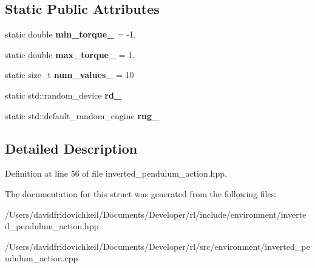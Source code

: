 \subsection*{Static Public Attributes}
\begin{DoxyCompactItemize}
\item 
\hypertarget{structrl_1_1_inverted_pendulum_action_a8528d08456532e7ed1f5a6db231b1f7c}{}\label{structrl_1_1_inverted_pendulum_action_a8528d08456532e7ed1f5a6db231b1f7c} 
static double {\bfseries min\+\_\+torque\+\_\+} = -\/1.
\item 
\hypertarget{structrl_1_1_inverted_pendulum_action_a6e16eacb6385fa7cbed55574aa289d25}{}\label{structrl_1_1_inverted_pendulum_action_a6e16eacb6385fa7cbed55574aa289d25} 
static double {\bfseries max\+\_\+torque\+\_\+} = 1.
\item 
\hypertarget{structrl_1_1_inverted_pendulum_action_a6ecf98651ffe081568448271dbfea5f0}{}\label{structrl_1_1_inverted_pendulum_action_a6ecf98651ffe081568448271dbfea5f0} 
static size\+\_\+t {\bfseries num\+\_\+values\+\_\+} = 10
\item 
\hypertarget{structrl_1_1_inverted_pendulum_action_a452e62a495021bd309ed00da4a73b212}{}\label{structrl_1_1_inverted_pendulum_action_a452e62a495021bd309ed00da4a73b212} 
static std\+::random\+\_\+device {\bfseries rd\+\_\+}
\item 
\hypertarget{structrl_1_1_inverted_pendulum_action_a14025e055bf7cdae2ca98b5cfbd4e0a0}{}\label{structrl_1_1_inverted_pendulum_action_a14025e055bf7cdae2ca98b5cfbd4e0a0} 
static std\+::default\+\_\+random\+\_\+engine {\bfseries rng\+\_\+}
\end{DoxyCompactItemize}


\subsection{Detailed Description}


Definition at line 56 of file inverted\+\_\+pendulum\+\_\+action.\+hpp.



The documentation for this struct was generated from the following files\+:\begin{DoxyCompactItemize}
\item 
/\+Users/davidfridovichkeil/\+Documents/\+Developer/rl/include/environment/inverted\+\_\+pendulum\+\_\+action.\+hpp\item 
/\+Users/davidfridovichkeil/\+Documents/\+Developer/rl/src/environment/inverted\+\_\+pendulum\+\_\+action.\+cpp\end{DoxyCompactItemize}
